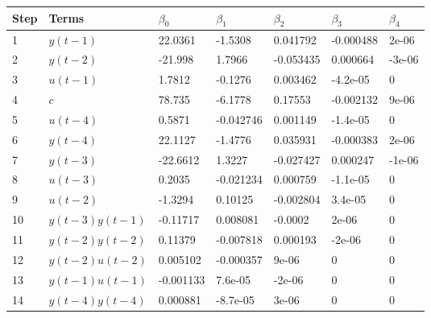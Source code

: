 \begin{tabular}{lllllll}
Step & Terms & $\beta_{0}$ & $\beta_{1}$ & $\beta_{2}$ & $\beta_{3}$ & $\beta_{4}$ \\ 
\hline 
1 & $y(t-1)$ & 22.0361 & -1.5308 & 0.041792 & -0.000488 & 2e-06 \\ 
2 & $y(t-2)$ & -21.998 & 1.7966 & -0.053435 & 0.000664 & -3e-06 \\ 
3 & $u(t-1)$ & 1.7812 & -0.1276 & 0.003462 & -4.2e-05 & 0 \\ 
4 & $c$ & 78.735 & -6.1778 & 0.17553 & -0.002132 & 9e-06 \\ 
5 & $u(t-4)$ & 0.5871 & -0.042746 & 0.001149 & -1.4e-05 & 0 \\ 
6 & $y(t-4)$ & 22.1127 & -1.4776 & 0.035931 & -0.000383 & 2e-06 \\ 
7 & $y(t-3)$ & -22.6612 & 1.3227 & -0.027427 & 0.000247 & -1e-06 \\ 
8 & $u(t-3)$ & 0.2035 & -0.021234 & 0.000759 & -1.1e-05 & 0 \\ 
9 & $u(t-2)$ & -1.3294 & 0.10125 & -0.002804 & 3.4e-05 & 0 \\ 
10 & $y(t-3)y(t-1)$ & -0.11717 & 0.008081 & -0.0002 & 2e-06 & 0 \\ 
11 & $y(t-2)y(t-2)$ & 0.11379 & -0.007818 & 0.000193 & -2e-06 & 0 \\ 
12 & $y(t-2)u(t-2)$ & 0.005102 & -0.000357 & 9e-06 & 0 & 0 \\ 
13 & $y(t-1)u(t-1)$ & -0.001133 & 7.6e-05 & -2e-06 & 0 & 0 \\ 
14 & $y(t-4)y(t-4)$ & 0.000881 & -8.7e-05 & 3e-06 & 0 & 0 \\ 
\hline 
\end{tabular}